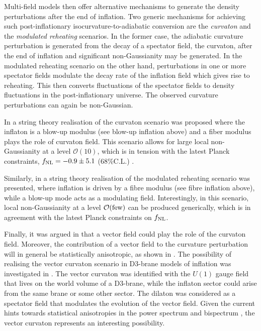 Multi-field models then offer alternative mechanisms to generate the density perturbations after the end of inflation. Two generic mechanisms for achieving such post-inflationary isocurvature-to-adiabatic conversion are  the  {\em curvaton}  \cite{Linde:1996gt,Lyth:2001nq,Moroi:2001ct} and the {\em modulated reheating} \cite{Dvali:2003em,Kofman:2003nx,Dvali:2003ar} scenarios. In the former case, the adiabatic curvature perturbation is generated from the decay of a spectator field, the curvaton, after the end of inflation and significant non-Gaussianity may be generated. 
In the modulated reheating scenario on the other hand, perturbations  in one or more  spectator fields modulate  the decay rate of the inflation field which gives rise to reheating.  This then  converts fluctuations of the spectator fields to density fluctuations in the post-inflationary universe. The observed curvature perturbations can again be non-Gaussian.  

In \cite{Burgess:2010bz} a string theory realisation of the curvaton  scenario  was proposed  where the inflaton is a  blow-up modulus (see blow-up inflation above) and a  fiber modulus plays the role of curvaton field.   This scenario 
 allows for large local non-Gaussianity at a level ${\mathcal O}(10)$, which is  in tension with the latest Planck constraints, $f_{\rm NL} =-0.9\pm 5.1$ (68\%C.L.) \cite{Planck:2019kim}.

Similarly, in \cite{Cicoli:2012cy} a string theory realisation of the modulated reheating scenario was presented,  where inflation is driven by a fibre modulus (see fibre inflation above), while a blow-up mode acts as a modulating field. Interestingly, in this scenario, local non-Gaussianity at a level  ${\mathcal O}({\rm few})$ can be produced generically, which is in agreement with the  latest Planck constraints on $f_{\rm NL}$. 

Finally, it was argued in \cite{Dimopoulos:2006ms,Dimopoulos:2011ws} that a vector field could play the role of the curvaton field. Moreover, the contribution of a vector field to the curvature perturbation will in general be statistically anisotropic, as shown in \cite{Dimopoulos:2008yv}. 
%
The possibility of realising the vector curvaton scenario in D3-brane models of inflation was investigated in \cite{Dimopoulos:2011pe}. The vector curvaton was identified with the $U(1)$ gauge field that lives on the world volume of a D3-brane, while the inflaton sector could arise from the same brane or some other sector. 
The dilaton was considered as a spectator field that modulates the evolution of the vector field. Given the current hints towards statistical anisotropies in the power spectrum and bispectrum \cite{Planck:2015igc}, the vector curvaton represents an interesting possibility.



